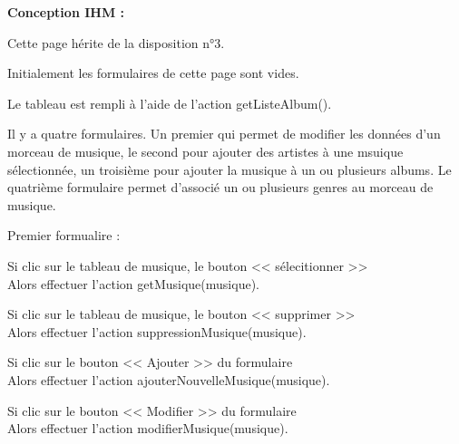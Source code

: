 			\begin{paragraphe}
				\textbf{Conception IHM :}
			\end{paragraphe}

			\begin{paragraphe}
				Cette page hérite de la disposition n°3. \par
				Initialement les formulaires de cette page sont vides. \par
				Le tableau est rempli à l'aide de l'action getListeAlbum().
			\end{paragraphe}


			\begin{paragraphe}
				Il y a quatre formulaires. Un premier qui permet de modifier les données d'un morceau de musique, le second pour ajouter des artistes à une msuique sélectionnée, un troisième pour ajouter la musique à un ou plusieurs albums. Le quatrième formulaire permet d'associé un ou plusieurs genres au morceau de musique.
			\end{paragraphe}

			\begin{paragraphe}
				Premier formualire :
			\end{paragraphe}

			\begin{paragraphe}
				Si clic sur le tableau de musique, le bouton << sélecitionner >> \\
				Alors effectuer l'action getMusique(musique).
			\end{paragraphe}

			\begin{paragraphe}
				Si clic sur le tableau de musique, le bouton << supprimer >> \\
				Alors effectuer l'action suppressionMusique(musique).
			\end{paragraphe}

			\begin{paragraphe}
				Si clic sur le bouton << Ajouter >> du formulaire \\
				Alors effectuer l'action ajouterNouvelleMusique(musique).
			\end{paragraphe}

			\begin{paragraphe}
				Si clic sur le bouton << Modifier >> du formulaire \\
				Alors effectuer l'action modifierMusique(musique).
			\end{paragraphe}

